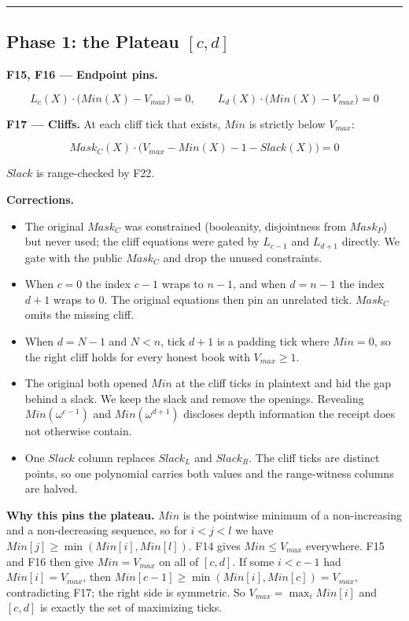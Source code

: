 \begin{center}\rule{0.5\linewidth}{0.5pt}\end{center}

\subsection{\texorpdfstring{Phase 1: the Plateau \([c, d]\)}{Phase 1: the Plateau [c, d]}}

\textbf{F15, F16 --- Endpoint pins.}

\[L_c(X) \cdot \big(Min(X) - V_{max}\big) = 0, \qquad L_d(X) \cdot \big(Min(X) - V_{max}\big) = 0\]

\textbf{F17 --- Cliffs.} At each cliff tick that exists, \(Min\) is strictly below \(V_{max}\):

\[Mask_C(X) \cdot \big(V_{max} - Min(X) - 1 - Slack(X)\big) = 0\]

\(Slack\) is range-checked by F22.

\textbf{Corrections.}

\begin{itemize}
\item
  The original \(Mask_C\) was constrained (booleanity, disjointness from \(Mask_P\)) but never used; the cliff equations were gated by \(L_{c-1}\) and \(L_{d+1}\) directly. We gate with the public \(Mask_C\) and drop the unused constraints.
\item
  When \(c = 0\) the index \(c-1\) wraps to \(n-1\), and when \(d = n-1\) the index \(d+1\) wraps to \(0\). The original equations then pin an unrelated tick. \(Mask_C\) omits the missing cliff.
\item
  When \(d = N-1\) and \(N < n\), tick \(d+1\) is a padding tick where \(Min = 0\), so the right cliff holds for every honest book with \(V_{max} \ge 1\).
\item
  The original both opened \(Min\) at the cliff ticks in plaintext and hid the gap behind a slack. We keep the slack and remove the openings. Revealing \(Min(\omega^{c-1})\) and \(Min(\omega^{d+1})\) discloses depth information the receipt does not otherwise contain.
\item
  One \(Slack\) column replaces \(Slack_L\) and \(Slack_R\). The cliff ticks are distinct points, so one polynomial carries both values and the range-witness columns are halved.
\end{itemize}

\textbf{Why this pins the plateau.} \(Min\) is the pointwise minimum of a non-increasing and a non-decreasing sequence, so for \(i < j < l\) we have \(Min[j] \ge \min(Min[i], Min[l])\). F14 gives \(Min \le V_{max}\) everywhere. F15 and F16 then give \(Min = V_{max}\) on all of \([c,d]\). If some \(i < c-1\) had \(Min[i] = V_{max}\), then \(Min[c-1] \ge \min(Min[i], Min[c]) = V_{max}\), contradicting F17; the right side is symmetric. So \(V_{max} = \max_i Min[i]\) and \([c,d]\) is exactly the set of maximizing ticks.

